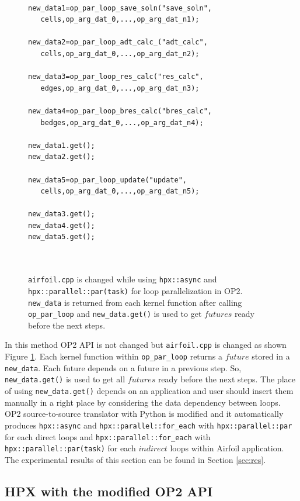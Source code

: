 \documentclass[conference]{IEEEtran}
\begin{document}
\begin{figure} [!h]
    \begin{lstlisting}   

new_data1=op_par_loop_save_soln("save_soln",
   cells,op_arg_dat_0,...,op_arg_dat_n1);
  
new_data2=op_par_loop_adt_calc_("adt_calc",
   cells,op_arg_dat_0,...,op_arg_dat_n2);
   
new_data3=op_par_loop_res_calc("res_calc",
   edges,op_arg_dat_0,...,op_arg_dat_n3);
 
new_data4=op_par_loop_bres_calc("bres_calc",
   bedges,op_arg_dat_0,...,op_arg_dat_n4);
   
new_data1.get();
new_data2.get();  
 
new_data5=op_par_loop_update("update",
   cells,op_arg_dat_0,...,op_arg_dat_n5);

new_data3.get();
new_data4.get();
new_data5.get();

    
    \end{lstlisting}
    \caption{\small{\texttt{airfoil.cpp} is changed while using \texttt{hpx::async} and \texttt{hpx::parallel::par(task)} for loop parallelization in OP2. \texttt{new\_data} is returned from each kernel function after calling \texttt{op\_par\_loop} and \texttt{new\_data.get()} is used to get $futures$ ready before the next steps.}}
    \label{l4}
\end{figure}


In this method OP2 API is not changed but \texttt{airfoil.cpp} is changed as shown Figure \ref{l4}. Each kernel function within \texttt{op\_par\_loop} returns a $future$ stored in a \texttt{new\_data}. Each future depends on a future in a previous step. So, \texttt{new\_data.get()} is used to get all $futures$ ready before the next steps. The place of using \texttt{new\_data.get()} depends on an application and user should insert them manually in a right place by considering the data dependency between loops. OP2 source-to-source translator with Python is modified and it automatically produces \texttt{hpx::async} and \texttt{hpx::parallel::for\_each} with \texttt{hpx::parallel::par} for each direct loops and \texttt{hpx::parallel::for\_each} with \texttt{hpx::parallel::par(task)} for each $indirect$ loops within Airfoil application. The experimental results of this section can be found in Section \ref{sec:res}.



\subsection{\textbf{HPX with the modified OP2 API}}
\label{sec:with}
\end{document}
